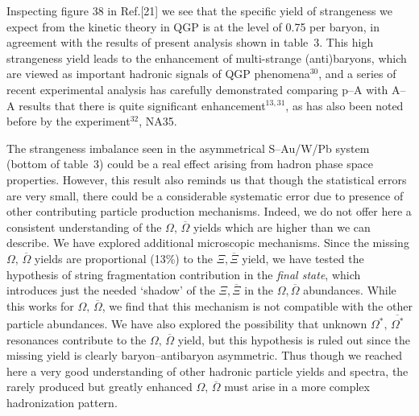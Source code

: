 \begin{mdframed}[linecolor=gray,roundcorner=12pt,backgroundcolor=Dandelion!15,linewidth=1pt,leftmargin=0cm,rightmargin=0cm,topline=true,bottomline=true,skipabove=12pt]
Inspecting figure 38 in Ref.[21] we see that the specific yield of strangeness we expect from the kinetic theory in QGP is at the level of 0.75 per baryon, in agreement with the results of present analysis shown in table~3. This high strangeness yield leads to the enhancement of multi-strange (anti)baryons, which are viewed as important hadronic signals of QGP phenomena$^{30}$, and a series of recent experimental analysis has carefully demonstrated comparing p--A with A--A results that there is quite significant enhancement$^{13,31}$, as has also been noted before by the experiment$^{32}$, NA35.

The strangeness imbalance seen in the asymmetrical S--Au/W/Pb system (bottom of table~3) could be a real effect arising from hadron phase space properties. However, this result also reminds us that though the statistical errors are very small, there could be a considerable systematic error due to presence of other contributing particle production mechanisms. Indeed, we do not offer here a consistent understanding of the $\Omega,\,\overline\Omega$ yields which are higher than we can describe. We have explored additional microscopic mechanisms. Since the missing $\Omega,\,\overline\Omega$ yields are proportional (13\%) to the $\Xi,\overline\Xi$ yield, we have tested the hypothesis of string fragmentation contribution in the {\it final state}, which introduces just the needed `shadow' of the $\Xi,\overline\Xi$ in the $\Omega,\overline\Omega$ abundances. While this works for $\Omega,\,\overline\Omega$, we find that this mechanism is not compatible with the other particle abundances. We have also explored the possibility that unknown $\Omega^*,\,\overline{\Omega^*}$ resonances contribute to the $\Omega,\,\overline\Omega$ yield, but this hypothesis is ruled out since the missing yield is clearly baryon--antibaryon asymmetric. Thus though we reached here a very good understanding of other hadronic particle yields and spectra, the rarely produced but greatly enhanced $\Omega,\,\overline\Omega$ must arise in a more complex hadronization pattern. 

\end{mdframed}
